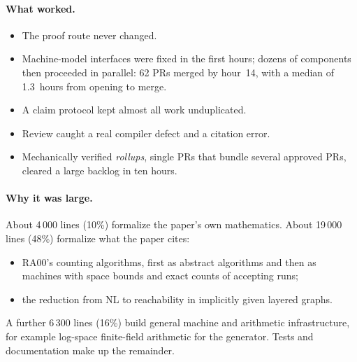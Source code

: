 \documentclass[11pt]{article}
\begin{document}
\paragraph{What worked.}
\begin{itemize}
\item The proof route never changed.
\item Machine-model interfaces were fixed in the first hours; dozens of components then
proceeded in parallel: 62 PRs merged by hour~14, with a median of 1.3~hours from opening to merge.
\item A claim protocol kept almost all work unduplicated.
\item Review caught a real compiler defect and a citation error.
\item Mechanically verified \emph{rollups}, single PRs that bundle several approved PRs, cleared a
large backlog in ten hours.
\end{itemize}

\paragraph{Why it was large.} About 4\,000 lines (10\%) formalize the paper's own mathematics.
About 19\,000 lines (48\%) formalize what the paper cites:
\begin{itemize}
\item RA00's counting algorithms, first as abstract algorithms and then as machines with space
bounds and exact counts of accepting runs;
\item the reduction from NL to reachability in implicitly given layered graphs.
\end{itemize}
A further 6\,300 lines (16\%) build general machine and arithmetic infrastructure, for example
log-space finite-field arithmetic for the generator. Tests and documentation make up the remainder.
\end{document}
